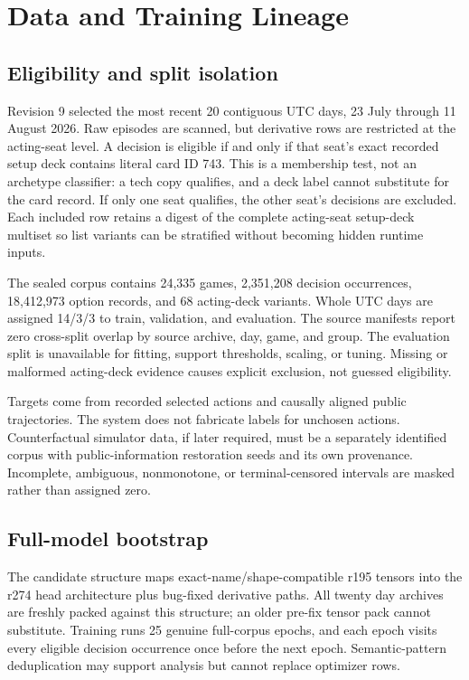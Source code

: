 \section{Data and Training Lineage}

\subsection{Eligibility and split isolation}

Revision 9 selected the most recent 20 contiguous UTC days, 23 July through 11
August 2026. Raw episodes are scanned, but derivative rows are restricted at
the acting-seat level. A decision is eligible if and only if that seat's exact
recorded setup deck contains literal card ID 743. This is a membership test,
not an archetype classifier: a tech copy qualifies, and a deck label cannot
substitute for the card record. If only one seat qualifies, the other seat's
decisions are excluded. Each included row retains a digest of the complete
acting-seat setup-deck multiset so list variants can be stratified without
becoming hidden runtime inputs.

The sealed corpus contains 24,335 games, 2,351,208 decision occurrences,
18,412,973 option records, and 68 acting-deck variants. Whole UTC days are
assigned 14/3/3 to train, validation, and evaluation. The source manifests
report zero cross-split overlap by source archive, day, game, and group. The
evaluation split is unavailable for fitting, support thresholds, scaling, or
tuning. Missing or malformed acting-deck evidence causes explicit exclusion,
not guessed eligibility.

Targets come from recorded selected actions and causally aligned public
trajectories. The system does not fabricate labels for unchosen actions.
Counterfactual simulator data, if later required, must be a separately
identified corpus with public-information restoration seeds and its own
provenance. Incomplete, ambiguous, nonmonotone, or terminal-censored intervals
are masked rather than assigned zero.

\subsection{Full-model bootstrap}

The candidate structure maps exact-name/shape-compatible r195 tensors into the
r274 head architecture plus bug-fixed derivative paths. All twenty day archives
are freshly packed against this structure; an older pre-fix tensor pack cannot
substitute. Training runs 25 genuine full-corpus epochs, and each epoch visits
every eligible decision occurrence once before the next epoch. Semantic-pattern
deduplication may support analysis but cannot replace optimizer rows.

